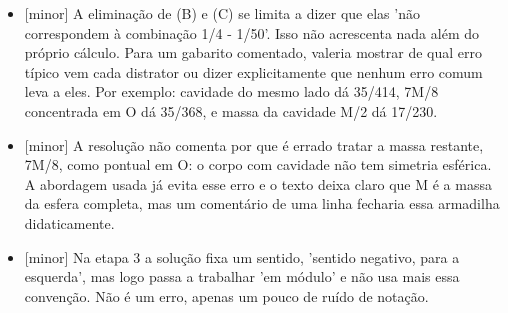 \documentclass{article}%
\begin{document}
\begin{itemize}%
\item%
{[}minor{]} A eliminação de (B) e (C) se limita a dizer que elas 'não correspondem à combinação 1/4 - 1/50'. Isso não acrescenta nada além do próprio cálculo. Para um gabarito comentado, valeria mostrar de qual erro típico vem cada distrator ou dizer explicitamente que nenhum erro comum leva a eles. Por exemplo: cavidade do mesmo lado dá 35/414, 7M/8 concentrada em O dá 35/368, e massa da cavidade M/2 dá 17/230.%
\item%
{[}minor{]} A resolução não comenta por que é errado tratar a massa restante, 7M/8, como pontual em O: o corpo com cavidade não tem simetria esférica. A abordagem usada já evita esse erro e o texto deixa claro que M é a massa da esfera completa, mas um comentário de uma linha fecharia essa armadilha didaticamente.%
\item%
{[}minor{]} Na etapa 3 a solução fixa um sentido, 'sentido negativo, para a esquerda', mas logo passa a trabalhar 'em módulo' e não usa mais essa convenção. Não é um erro, apenas um pouco de ruído de notação.%
\end{itemize}%
\end{document}
